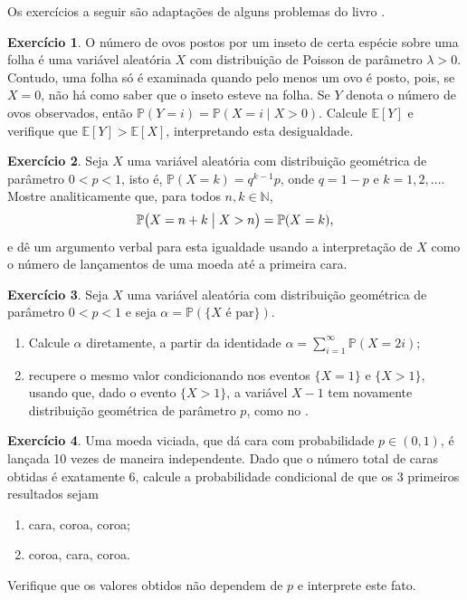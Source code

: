 \documentclass[12pt,portuguese]{article}
\theoremstyle{definition}
\newtheorem{exercise}{Exercício}
\begin{document}
\bigskip 
\noindent Os exercícios a seguir são adaptações de alguns problemas do livro
\cite{Ross2010}.
\bigskip 

\begin{exercise}\label{exercise:poisson-truncada}
O número de ovos postos por um inseto de certa espécie sobre uma folha é
uma variável aleatória \(X\) com distribuição de Poisson de parâmetro
\(\lambda > 0\). Contudo, uma folha só é examinada quando pelo menos um
ovo é posto, pois, se \(X = 0\), não há como saber que o inseto esteve na
folha. Se \(Y\) denota o número de ovos observados, então
\(\mathbb{P}(Y = i) = \mathbb{P}(X = i \mid X > 0)\). Calcule
\(\mathbb{E}[Y]\) e verifique que \(\mathbb{E}[Y] > \mathbb{E}[X]\),
interpretando esta desigualdade.
\end{exercise}


\begin{exercise}\label{exercise:geometrica-perda-memoria}
Seja \(X\) uma variável aleatória com distribuição geométrica de
parâmetro \(0 < p < 1\), isto é, \(\mathbb{P}(X = k) = q^{k-1}p\), onde
\(q = 1 - p\) e \(k = 1, 2, \ldots\). Mostre analiticamente que, para
todos \(n, k \in \mathbb{N}\),
\[
\mathbb{P}\bigl(X = n + k \bigm| X > n\bigr) = \mathbb{P}(X = k),
\]
e dê um argumento verbal para esta igualdade usando a interpretação de
\(X\) como o número de lançamentos de uma moeda até a primeira cara.
\end{exercise}


\begin{exercise}\label{exercise:geometrica-paridade}
Seja \(X\) uma variável aleatória com distribuição geométrica de
parâmetro \(0 < p < 1\) e seja \(\alpha = \mathbb{P}(\{X \text{ é par}\})\).
\begin{enumerate}[label=(\alph*)]
  \item Calcule \(\alpha\) diretamente, a partir da identidade
        \(\alpha = \displaystyle\sum_{i=1}^{\infty} \mathbb{P}(X = 2i)\);
  \item recupere o mesmo valor condicionando nos eventos \(\{X = 1\}\) e
        \(\{X > 1\}\), usando que, dado o evento \(\{X > 1\}\), a variável
        \(X - 1\) tem novamente distribuição geométrica de parâmetro
        \(p\), como no .
\end{enumerate}
\end{exercise}


\begin{exercise}\label{exercise:binomial-condicionada}
Uma moeda viciada, que dá cara com probabilidade \(p \in (0,1)\), é
lançada 10 vezes de maneira independente. Dado que o número total de
caras obtidas é exatamente 6, calcule a probabilidade condicional de que
os 3 primeiros resultados sejam
\begin{enumerate}[label=(\alph*)]
  \item cara, coroa, coroa;
  \item coroa, cara, coroa.
\end{enumerate}
Verifique que os valores obtidos não dependem de \(p\) e interprete este
fato.
\end{exercise}
\end{document}
